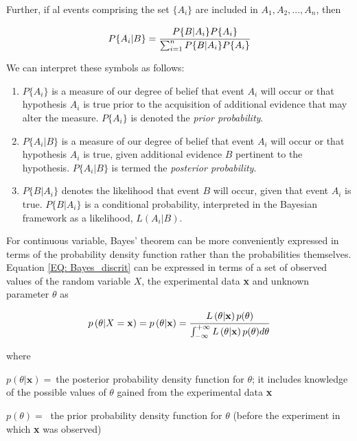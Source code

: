 \documentclass[a4paper,fleqn]{cas-dc}
\begin{document}
Further, if al events comprising the set $\{A_i\}$ are included in $A_1,A_2,...,A_n$, then

{\footnotesize
\begin{equation} \label{EQ: Bayes_discrit}
	P\{A_i|B\} = \cfrac{P\{B|A_i\}P\{A_i\}}{ \sum_{i=1}^{n} P\{B|A_i\} P\{A_i\} }
\end{equation} }

We can interpret these symbols as follows:

\begin{enumerate}
	\item $P\{A_i\}$ is a measure of our degree of belief that event $A_i$ will occur or that hypothesis $A_i$ is true prior to the acquisition of additional evidence that may alter the measure. $P\{A_i\}$ is denoted the \textit{prior probability}.
	\item $P\{A_i|B\}$ is a measure of our degree of belief that event $A_i$ will occur or that hypothesis $A_i$ is true, given additional evidence $B$ pertinent to the hypothesis. $P\{A_i|B\}$ is termed the \textit{posterior probability}.
	\item $P\{B|A_i\}$ denotes the likelihood that event $B$ will occur, given that event $A_i$ is true. $P\{B|A_i\}$ is a conditional probability, interpreted in the Bayesian framework as a likelihood, $L(A_i|B)$.
\end{enumerate}

For continuous variable, Bayes' theorem can be more conveniently expressed in terms of the probability density function rather than the probabilities themselves. Equation \ref{EQ: Bayes_discrit} can be expressed in terms of a set of observed values of the random variable $X$, the experimental data \textbf{x} and unknown parameter $\theta$ as

{\footnotesize
\begin{equation} \label{EQ: Bayes_continous}
	p\left( \theta|X=\textbf{x} \right) = p\left( \theta|\textbf{x} \right) = \cfrac{L\left( \theta|\textbf{x} \right) p(\theta)}{\int_{-\infty}^{+\infty} L\left( \theta|\textbf{x} \right) p(\theta) d\theta}
\end{equation} }

where

$p(\theta|\textbf{x}) = ~$the posterior probability density function for $\theta$; it includes knowledge of the possible values of $\theta$ gained from the experimental data \textbf{x}

$p(\theta) = ~$ the prior probability density function for $\theta$ (before the experiment in which \textbf{x} was observed)
\end{document}
